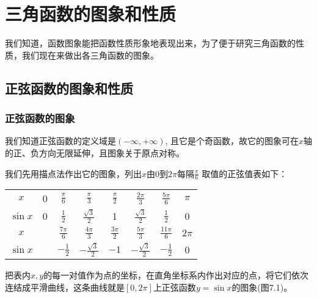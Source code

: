 \chapter{三角函数的图象和性质}
我们知道，函数图象能把函数性质形象地表现出来，为了便于研究三角函数的性质，我们现在来做出各三角函数的图象。
\section{正弦函数的图象和性质}
\subsection{正弦函数的图象}

我们知道正弦函数的定义域是$(-\infty, +\infty)$, 且它是个奇函数，故它的图象可在$x$轴的正、负方向无限延伸，且图象关于原点对称。

我们先用描点法作出它的图象，列出$x$由0到$2\pi$每隔$\frac{\pi}{6}$
取值的正弦值表如下：

\begin{center}
\begin{tabular}{c|ccccccc}
    \hline
$x$ & 0& $\frac{\pi}{6}$& $\frac{\pi}{3}$& $\frac{\pi}{2}$& $\frac{2\pi}{3}$& $\frac{5\pi}{6}$& $\pi$\\
$\sin x$ & 0  & $\frac{1}{2}$  & $\frac{\sqrt{3}}{2}$  & 1  & $\frac{\sqrt{3}}{2}$  & $\frac{1}{2}$ & 0\\
\hline
$x$ && $\frac{7\pi}{6}$& $\frac{4\pi}{3}$& $\frac{3\pi}{2}$& $\frac{5\pi}{3}$& $\frac{11\pi}{6}$&$2\pi$\\
$\sin x$ && $-\frac{1}{2}$  & $-\frac{\sqrt{3}}{2}$  & $-1$  & $-\frac{\sqrt{3}}{2}$  & $-\frac{1}{2}$  & 0\\
\hline
\end{tabular}
\end{center}

把表内$x,y$的每一对值作为点的坐标，在直角坐标系内作出对应的点，将它们依次连结成平滑曲线，这条曲线就是$[0, 2\pi]$上正弦函数$y=\sin x$的图象(图7.1)。

